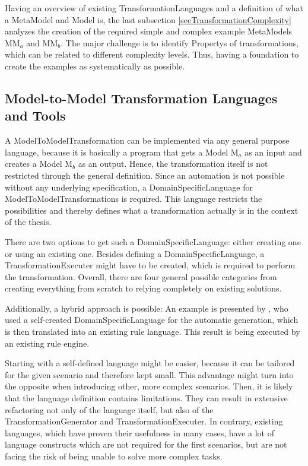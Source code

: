 Having an overview of existing \glspl{TransformationLanguage} and a definition of what a \gls{MetaModel} and \gls{Model} is, the last subsection \ref{secTransformationComplexity} analyzes the creation of the required simple and complex example \glspl{MetaModel} MM$_a$ and MM$_b$. The major challenge is to identify \glspl{Property} of transformations, which can be related to different complexity levels. Thus, having a foundation to create the examples as systematically as possible.

\subsection{Model-to-Model Transformation Languages and Tools}\label{secExistingModelTransformationLanguagesAndTools}

A \gls{ModelToModelTransformation} can be implemented via any general purpose language, because it is basically a program that gets a \gls{Model} M$_a$ as an input and creates a \gls{Model} M$_b$ as an output. Hence, the transformation itself is not restricted through the general definition. Since an automation is not possible without any underlying specification, a \gls{DomainSpecificLanguage} for \glspl{ModelToModelTransformation} is required. This language restricts the possibilities and thereby defines what a transformation actually is in the context of the thesis. %

There are two options to get such a \gls{DomainSpecificLanguage}: either creating one or using an existing one. Besides defining a \gls{DomainSpecificLanguage}, a \gls{TransformationExecuter} might have to be created, which is required to perform the transformation. Overall, there are four general possible categories from creating everything from scratch to relying completely on existing solutions.

Additionally, a hybrid approach is possible: An example is presented by \cite{Faunes2013}, who used a self-created \gls{DomainSpecificLanguage} for the automatic generation, which is then translated into an existing rule language. This result is being executed by an existing rule engine. %

Starting with a self-defined language might be easier, because it can be tailored for the given scenario and therefore kept small. This advantage might turn into the opposite when introducing other, more complex scenarios. Then, it is likely that the language definition contains limitations. They can result in extensive refactoring not only of the language itself, but also of the \gls{TransformationGenerator} and \gls{TransformationExecuter}. In contrary, existing languages, which have proven their usefulness in many cases, have a lot of language constructs which are not required for the first scenarios, but are not facing the risk of being unable to solve more complex tasks. 

